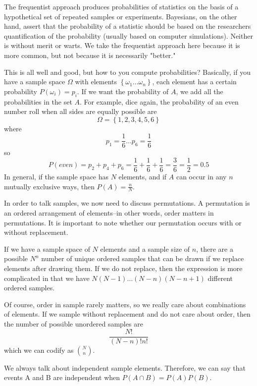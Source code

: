 The frequentist approach produces probabilities of statistics on the basis of a hypothetical set of repeated samples or experiments. Bayesians, on the other hand, assert that the probability of a statistic should be based on the researchers quantification of the probability (usually based on computer simulations). Neither is without merit or warts. We take the frequentist approach here because it is more common, but not because it is necessarily "better."

This is all well and good, but how to you compute probabilities? Basically, if you have a sample space $\Omega$ with elements $\left\{\omega_1 \ldots \omega_n\right\}$, each element has a certain probability $P\left(\omega_i\right) = p_i$. If we want the probability of $A$, we add all the probabilities in the set $A$. For example, dice again, the probability of an even number roll when all sides are equally possible are
\[
\Omega = \left\{1,2,3,4,5,6\right\}
\]
where
\[
p_1 = \frac{1}{6}\ldots p_6= \frac{1}{6}
\]
so
\[
P\left(even\right) = p_2+p_4+p_6 = \frac{1}{6}+\frac{1}{6}+\frac{1}{6} = \frac{3}{6} = \frac{1}{2} = 0.5
\]
In general, if the sample space has $N$ elements, and if $A$ can occur in any $n$ mutually exclusive ways, then $P\left(A\right) = \frac{n}{N}$.

In order to talk samples, we now need to discuss permutations. A permutation is an ordered arrangement of elements--in other words, order matters in permutations. It is important to note whether our permutation occurs with or without replacement.

If we have a sample space of $N$ elements and a sample size of $n$, there are a possible $N^n$ number of unique ordered samples that can be drawn if we replace elements after drawing them. If we do not replace, then the expression is more complicated in that we have $N\left(N-1\right)\ldots\left(N-n\right)\left(N-n+1\right)$ different ordered samples.

Of course, order in sample rarely matters, so we really care about combinations of elements. If we sample without replacement and do not care about order, then the number of possible unordered samples are
\begin{equation}
\frac{N!}{\left(N-n\right)!n!}
\end{equation}
which we can codify as ${N \choose n}$.

We always talk about independent sample elements. Therefore, we can say that events A and B are independent when $P\left(A \cap B\right) = P\left(A\right)P\left(B\right)$.
